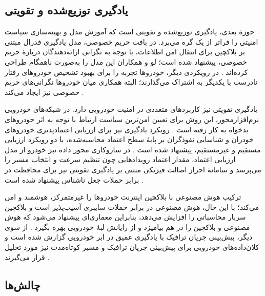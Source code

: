 \subsection{یادگیری توزیع‌شده و تقویتی}

حوزهٔ بعدی، یادگیری توزیع‌شده و تقویتی است که آموزش مدل و بهینه‌سازی سیاست امنیتی را فراتر از یک گره می‌برد. در بافت حریم خصوصی، مدل یادگیری فدرال  مبتنی بر بلاکچین برای انتقال امن اطلاعات، با توجه به نگرانی ارائه‌دهندگان دربارهٔ حریم خصوصی، پیشنهاد شده است؛ لو و همکاران این مدل را به‌صورت ناهمگام طراحی کرده‌اند \cite{farsimadanReviewSecurityChallenges2025}. در رویکردی دیگر، خودروها تجربه را برای بهبود تشخیص خودروهای رفتار نادرست با یکدیگر به اشتراک می‌گذارند؛ البته همکاری میان خودروها نگرانی‌های حریم خصوصی نیز ایجاد می‌کند \cite{farsimadanReviewSecurityChallenges2025}.

یادگیری تقویتی  نیز کاربردهای متعددی در امنیت خودرویی دارد. در شبکه‌های خودرویی نرم‌افزارمحور، این روش برای تعیین امن‌ترین سیاست ارتباط با توجه به اثر خودروهای بدخواه به کار رفته است \cite{farsimadanReviewSecurityChallenges2025}. رویکرد یادگیری  نیز برای ارزیابی اعتمادپذیری خودروهای خودران و شناسایی نفوذگران بر پایهٔ سطح اعتماد محاسبه‌شده، با دو رویکرد ارزیابی مستقیم و غیرمستقیم، پیشنهاد شده است \cite{farsimadanReviewSecurityChallenges2025}. در سازوکاری محور داده نیز خودرو از مدل ارزیابی اعتماد، مقدار اعتماد رویدادهایی چون تنظیم سرعت و انتخاب مسیر را می‌پرسد \cite{farsimadanReviewSecurityChallenges2025} و سامانهٔ احراز اصالت فیزیکی مبتنی بر یادگیری تقویتی نیز برای محافظت در برابر حملات جعل ناشناس پیشنهاد شده است \cite{farsimadanReviewSecurityChallenges2025}.

ترکیب هوش مصنوعی با بلاکچین اینترنت خودروها را غیرمتمرکز، هوشمند و امن می‌کند؛ با این حال، هوش مصنوعی در برابر حملات سایبری آسیب‌پذیر است و بلاکچین سربار محاسباتی را افزایش می‌دهد، بنابراین معماری‌ای پیشنهاد می‌شود که هوش مصنوعی و بلاکچین را در هم بیامیزد و از رایانش لبهٔ خودرویی بهره بگیرد \cite{hozouriOverviewVANETVehicular2023}. از سوی دیگر، پیش‌بینی جریان ترافیک با یادگیری عمیق در ابر خودرویی گزارش شده است \cite{farsimadanReviewSecurityChallenges2025} و کلان‌داده‌های خودرویی برای پیش‌بینی جریان ترافیک و مسیر کوتاه‌مدت نیز مورد تحلیل قرار می‌گیرند \cite{xuInternetVehiclesBig2018}.

\subsection{چالش‌ها}

